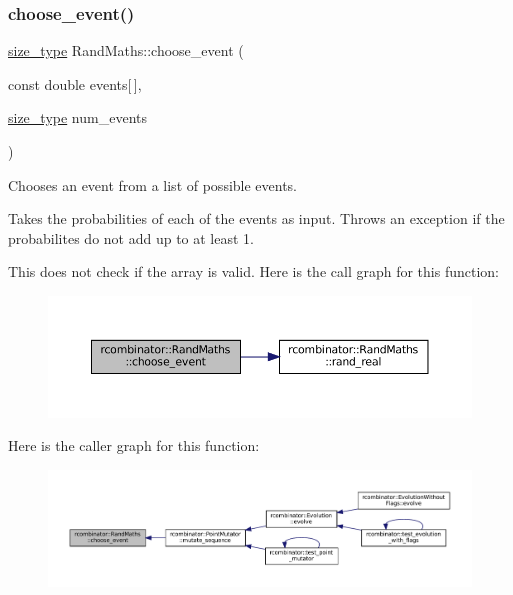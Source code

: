 \subsubsection{\texorpdfstring{choose\+\_\+event()}{choose\_event()}}
{\footnotesize\ttfamily \mbox{\hyperlink{constants_8h_abcd18a5521fc90ff6e7b00e4fee98397}{size\+\_\+type}} Rand\+Maths\+::choose\+\_\+event (\begin{DoxyParamCaption}\item[{const double}]{events\mbox{[}$\,$\mbox{]},  }\item[{\mbox{\hyperlink{constants_8h_abcd18a5521fc90ff6e7b00e4fee98397}{size\+\_\+type}}}]{num\+\_\+events }\end{DoxyParamCaption})}



Chooses an event from a list of possible events. 

Takes the probabilities of each of the events as input. Throws an exception if the probabilites do not add up to at least 1.

This does not check if the array is valid. Here is the call graph for this function\+:
\nopagebreak
\begin{figure}[H]
\begin{center}
\leavevmode
\includegraphics[width=350pt]{classrcombinator_1_1RandMaths_a3834f9a074546f0d588247610f16fb0e_cgraph}
\end{center}
\end{figure}
Here is the caller graph for this function\+:
\nopagebreak
\begin{figure}[H]
\begin{center}
\leavevmode
\includegraphics[width=350pt]{classrcombinator_1_1RandMaths_a3834f9a074546f0d588247610f16fb0e_icgraph}
\end{center}
\end{figure}
\mbox{\label{classrcombinator_1_1RandMaths_ae54dee1a16fb0e275e1624ccaa7dc87e}} 
